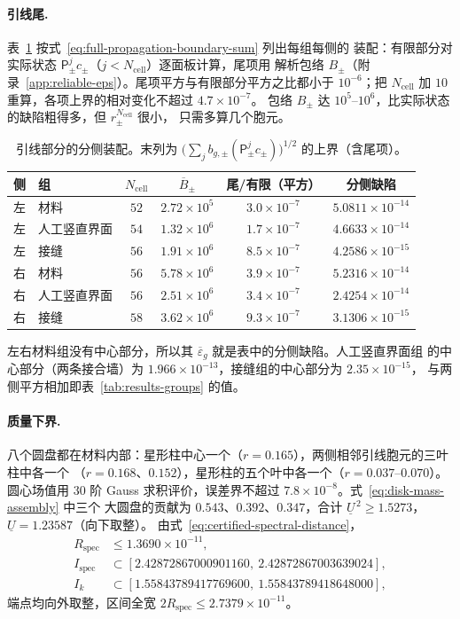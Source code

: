 \paragraph{引线尾.}
表~\ref{tab:results-tails} 按式~\eqref{eq:full-propagation-boundary-sum} 列出每组每侧的
装配：有限部分对实际状态 $\mathsf P_\pm^jc_\pm$（$j<N_{\mathrm{cell}}$）逐面板计算，尾项用
解析包络 $B_\pm$（附录~\ref{app:reliable-eps}）。尾项平方与有限部分平方之比都小于
$10^{-6}$；把 $N_{\mathrm{cell}}$ 加 $10$ 重算，各项上界的相对变化不超过 $4.7\times10^{-7}$。
包络 $B_\pm$ 达 $10^5$--$10^6$，比实际状态的缺陷粗得多，但 $r_\pm^{N_{\mathrm{cell}}}$ 很小，
只需多算几个胞元。
\begin{table}[htbp]
  \centering
  \caption{引线部分的分侧装配。末列为 $\bigl(\sum_jb_{g,\pm}(\mathsf P_\pm^jc_\pm)\bigr)^{1/2}$
  的上界（含尾项）。}
  \label{tab:results-tails}
  \begin{tabular}{llcccc}
    \toprule
    侧 & 组 & $N_{\mathrm{cell}}$ & $\overline B_\pm$ & 尾/有限（平方） & 分侧缺陷\\
    \midrule
    左 & 材料 & $52$ & $2.72\times10^{5}$ & $3.0\times10^{-7}$ & $5.0811\times10^{-14}$\\
    左 & 人工竖直界面 & $54$ & $1.32\times10^{6}$ & $1.7\times10^{-7}$ & $4.6633\times10^{-14}$\\
    左 & 接缝 & $56$ & $1.91\times10^{6}$ & $8.5\times10^{-7}$ & $4.2586\times10^{-15}$\\
    右 & 材料 & $56$ & $5.78\times10^{6}$ & $3.9\times10^{-7}$ & $5.2316\times10^{-14}$\\
    右 & 人工竖直界面 & $56$ & $2.51\times10^{6}$ & $3.4\times10^{-7}$ & $2.4254\times10^{-14}$\\
    右 & 接缝 & $58$ & $3.62\times10^{6}$ & $9.3\times10^{-7}$ & $3.1306\times10^{-15}$\\
    \bottomrule
  \end{tabular}
\end{table}
左右材料组没有中心部分，所以其 $\overline\varepsilon_g$ 就是表中的分侧缺陷。人工竖直界面组
的中心部分（两条接合墙）为 $1.966\times10^{-13}$，接缝组的中心部分为 $2.35\times10^{-15}$，
与两侧平方相加即表~\ref{tab:results-groups} 的值。

\paragraph{质量下界.}
八个圆盘都在材料内部：星形柱中心一个（$r=0.165$），两侧相邻引线胞元的三叶柱中各一个
（$r=0.168$、$0.152$），星形柱的五个叶中各一个（$r=0.037$--$0.070$）。圆心场值用 $30$ 阶
Gauss 求积评价，误差界不超过 $7.8\times10^{-8}$。式~\eqref{eq:disk-mass-assembly} 中三个
大圆盘的贡献为 $0.543$、$0.392$、$0.347$，合计 $\underline U^{\,2}\ge1.5273$，
$\underline U=1.23587$（向下取整）。
由式~\eqref{eq:certified-spectral-distance}，
\begin{align*}
  R_{\mathrm{spec}}&\le1.3690\times10^{-11},\\
  I_{\mathrm{spec}}&\subset[2.42872867000901160,\ 2.42872867003639024],\\
  I_k&\subset[1.55843789417769600,\ 1.55843789418648000],
\end{align*}
端点均向外取整，区间全宽 $2R_{\mathrm{spec}}\le2.7379\times10^{-11}$。

